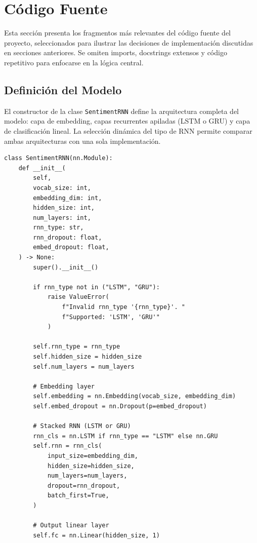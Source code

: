 \section{Código Fuente}
\label{sec:codigo}

Esta sección presenta los fragmentos más relevantes del código fuente del proyecto, seleccionados para ilustrar las decisiones de implementación discutidas en secciones anteriores. Se omiten imports, docstrings extensos y código repetitivo para enfocarse en la lógica central.


\subsection{Definición del Modelo}

El constructor de la clase \texttt{SentimentRNN} define la arquitectura completa del modelo: capa de embedding, capas recurrentes apiladas (LSTM o GRU) y capa de clasificación lineal. La selección dinámica del tipo de RNN permite comparar ambas arquitecturas con una sola implementación.

\begin{verbatim}
class SentimentRNN(nn.Module):
    def __init__(
        self,
        vocab_size: int,
        embedding_dim: int,
        hidden_size: int,
        num_layers: int,
        rnn_type: str,
        rnn_dropout: float,
        embed_dropout: float,
    ) -> None:
        super().__init__()

        if rnn_type not in ("LSTM", "GRU"):
            raise ValueError(
                f"Invalid rnn_type '{rnn_type}'. "
                f"Supported: 'LSTM', 'GRU'"
            )

        self.rnn_type = rnn_type
        self.hidden_size = hidden_size
        self.num_layers = num_layers

        # Embedding layer
        self.embedding = nn.Embedding(vocab_size, embedding_dim)
        self.embed_dropout = nn.Dropout(p=embed_dropout)

        # Stacked RNN (LSTM or GRU)
        rnn_cls = nn.LSTM if rnn_type == "LSTM" else nn.GRU
        self.rnn = rnn_cls(
            input_size=embedding_dim,
            hidden_size=hidden_size,
            num_layers=num_layers,
            dropout=rnn_dropout,
            batch_first=True,
        )

        # Output linear layer
        self.fc = nn.Linear(hidden_size, 1)
\end{verbatim}

